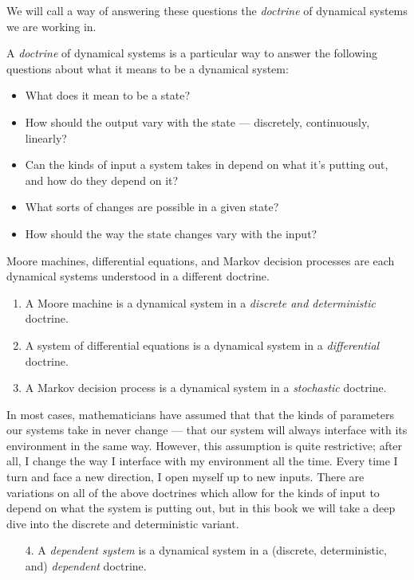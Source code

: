 \documentclass[DynamicalBook]{subfiles}
\begin{document}
We will call a way of answering these questions the \emph{doctrine} of dynamical
systems we are working in.
\begin{informal}
  A \emph{doctrine} of dynamical systems is a particular way to answer the following
  questions about what it means to be a dynamical system:
  \begin{itemize}
  \item What does it mean to be a state?
  \item How should the output vary with the state --- discretely,
    continuously, linearly?
  \item Can the kinds of input a
    system takes in depend on what it's putting out, and how do they depend on it?
  \item What sorts of changes are possible in a given state?
  \item How should the way the state changes vary with the input?
  \end{itemize}
\end{informal}

Moore machines, differential equations, and Markov decision processes are each
dynamical systems understood in a different doctrine.
\begin{enumerate}
  \item A Moore machine is a dynamical system in a \emph{discrete and
      deterministic} doctrine.
  \item A system of differential equations is a dynamical system in a
    \emph{differential} doctrine.
  \item A Markov decision process is a dynamical system in a \emph{stochastic} doctrine.
\end{enumerate}

In most cases, mathematicians have assumed that that the kinds of parameters our systems take in
never change --- that our system will always interface with
    its environment in the same way. However, this assumption is quite
    restrictive; after all, I change the way I interface with my environment all
    the time. Every time I turn and face a new direction, I open myself up to
    new inputs. There are variations on all of the above doctrines which allow for the
    kinds of input to depend on what the system is putting out, but in this book
    we will take a deep dive into the discrete and deterministic variant.

\begin{enumerate}
  \item[4.] A \emph{dependent system} is a dynamical system in a
    (discrete, deterministic, and) \emph{dependent} doctrine.
\end{enumerate}
\end{document}
